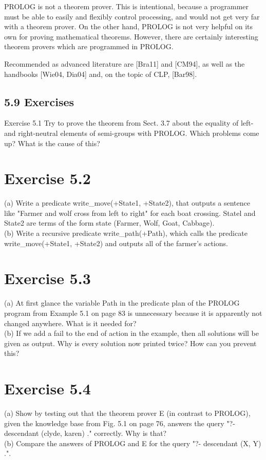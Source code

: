 \documentclass[10pt]{article}
\begin{document}
PROLOG is not a theorem prover. This is intentional, because a programmer must be able to easily and flexibly control processing, and would not get very far with a theorem prover. On the other hand, PROLOG is not very helpful on its own for proving mathematical theorems. However, there are certainly interesting theorem provers which are programmed in PROLOG.

Recommended as advanced literature are [Bra11] and [CM94], as well as the handbooks [Wie04, Dia04] and, on the topic of CLP, [Bar98].

\subsection*{5.9 Exercises}
Exercise 5.1 Try to prove the theorem from Sect. 3.7 about the equality of left- and right-neutral elements of semi-groups with PROLOG. Which problems come up? What is the cause of this?

\section*{Exercise 5.2}
(a) Write a predicate write\_move(+State1, +State2), that outputs a sentence like "Farmer and wolf cross from left to right" for each boat crossing. Statel and State2 are terms of the form state (Farmer, Wolf, Goat, Cabbage).\\
(b) Write a recursive predicate write\_path(+Path), which calls the predicate write\_move(+State1, +State2) and outputs all of the farmer's actions.

\section*{Exercise 5.3}
(a) At first glance the variable Path in the predicate plan of the PROLOG program from Example 5.1 on page 83 is unnecessary because it is apparently not changed anywhere. What is it needed for?\\
(b) If we add a fail to the end of action in the example, then all solutions will be given as output. Why is every solution now printed twice? How can you prevent this?

\section*{Exercise 5.4}
(a) Show by testing out that the theorem prover E (in contrast to PROLOG), given the knowledge base from Fig. 5.1 on page 76, answers the query "?- descendant (clyde, karen) ." correctly. Why is that?\\
(b) Compare the answers of PROLOG and E for the query "?- descendant (X, Y) .".
\end{document}
